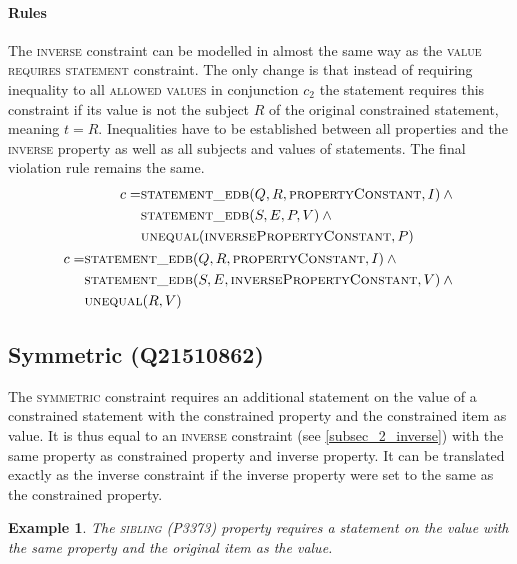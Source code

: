 \documentclass[hyperref,bachelorofscience,fleqn]{cgvpub}
\newtheorem{example}{Example}
\begin{document}
\paragraph{Rules}
The \textsc{inverse} constraint can be modelled in almost the same way as the \textsc{value requires statement} constraint. The only change is that instead of requiring inequality to all \textsc{allowed values} in conjunction \(c_2\) the statement requires this constraint if its value is not the subject \(R\) of the original constrained statement, meaning \(t = R\). Inequalities have to be established between all properties and the \textsc{inverse} property as well as all subjects and values of statements. The final violation rule remains the same.
\begin{align}
\begin{split}
c = &\textsc{statement\_edb}(Q, R, \textsc{propertyConstant}, I) \wedge{} \\
&\textsc{statement\_edb}(S, E, P, V) \wedge{} \\
&\textsc{unequal}(\textsc{inversePropertyConstant}, P)
\end{split}\\
\begin{split}
c = &\textsc{statement\_edb}(Q, R, \textsc{propertyConstant}, I) \wedge{} \\
&\textsc{statement\_edb}(S, E, \textsc{inversePropertyConstant}, V) \wedge{} \\
&\textsc{unequal}(R, V)
\end{split}
\end{align}


\subsection{Symmetric (Q21510862)}
The \textsc{symmetric} constraint requires an additional statement on the value of a constrained statement with the constrained property and the constrained item as value. It is thus equal to an \textsc{inverse} constraint (see \ref{subsec_2_inverse}) with the same property as constrained property and inverse property. It can be translated exactly as the inverse constraint if the inverse property were set to the same as the constrained property.

\begin{example}
The \textsc{sibling} (P3373) property requires a statement on the value with the same property and the original item as the value.
\end{example}
\end{document}
